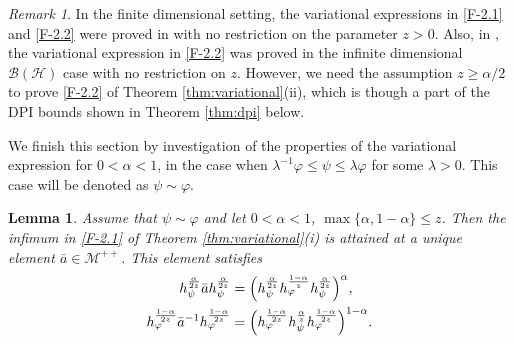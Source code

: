 \documentclass[12pt]{article}
\newtheorem{lemma}[theorem]{Lemma}
\theoremstyle{definition}
\theoremstyle{remark}
\newtheorem{remark}[theorem]{Remark}
\numberwithin{equation}{section}
\def\Me{\mathcal M}
\def\ffi{\varphi}
\begin{document}
\begin{remark}\label{remark:variational}
In the finite dimensional setting, the variational expressions in \eqref{F-2.1} and \eqref{F-2.2} were proved
in \cite[Theorem 3.3]{zhang2020fromwyd} with no restriction on the parameter $z>0$. Also, in
\cite[Lemma 3.23]{mosonyi2023thestrong}, the variational expression in \eqref{F-2.2} was proved in the
infinite dimensional $\mathcal{B}(\mathcal{H})$ case with no restriction on $z$.
However, we need the assumption $z\ge\alpha/2$ to prove \eqref{F-2.2} of
Theorem \ref{thm:variational}(ii), which is though a part of the DPI bounds shown in
Theorem \ref{thm:dpi} below.
\end{remark}

\medskip
We finish this section by investigation of the properties of the variational expression for
$0<\alpha<1$, in the case when $\lambda^{-1}\ffi\le \psi\le \lambda \ffi$ for some
$\lambda>0$. This case will be denoted as $\psi\sim \ffi$. 

\begin{lemma}\label{lemma:variational_majorized}
Assume that $\psi\sim\ffi$ and let $0<\alpha<1$,
$\max\{\alpha,1-\alpha\}\le z$. Then the infimum in \eqref{F-2.1} of Theorem \ref{thm:variational}(i) is
attained at a unique element $\bar a\in \Me^{++}$. This element satisfies
\begin{align}
h_\psi^{\alpha\over2z}\bar ah_\psi^{\alpha\over2z}
&=\Bigl(h_\psi^{\alpha\over2z}h_\ffi^{1-\alpha\over z}h_\psi^{\alpha\over2z}\Bigr)^\alpha,
\label{eq:minimizer1}\\
h_\ffi^{1-\alpha\over2z}\bar a^{-1}h_\ffi^{1-\alpha\over2z}
&=\Bigl(h_\ffi^{1-\alpha\over2z}h_\psi^{\alpha\over
z}h_\ffi^{1-\alpha\over2z}\Bigr)^{1-\alpha}.
\label{eq:minimizer2}
\end{align}
\end{lemma}
\end{document}
